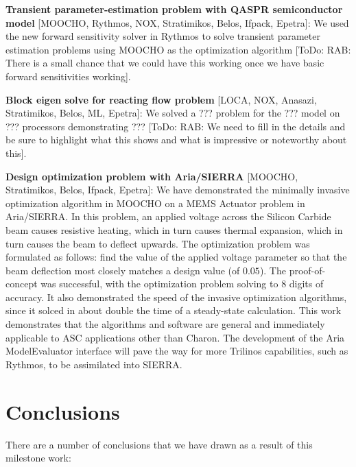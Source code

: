 \documentclass[pdf,ps2pdf,11pt]{SANDreport}
\begin{document}
{}\noindent\textbf{Transient parameter-estimation problem with QASPR
semiconductor model} [MOOCHO, Rythmos, NOX, Stratimikos, Belos, Ifpack,
Epetra]: We used the new forward sensitivity solver in Rythmos to solve
transient parameter estimation problems using MOOCHO as the optimization
algorithm [ToDo: RAB: There is a small chance that we could have this working
once we have basic forward sensitivities working].

{}\noindent\textbf{Block eigen solve for reacting flow problem} [LOCA, NOX,
Anasazi, Stratimikos, Belos, ML, Epetra]: We solved a ??? problem for the ??? 
model on ??? processors demonstrating ??? [ToDo: RAB: We need to fill in the
details and be sure to highlight what this shows and what is impressive or
noteworthy about this].

{}\noindent\textbf{Design optimization problem with Aria/SIERRA} [MOOCHO,
Stratimikos, Belos, Ifpack, Epetra]: We have demonstrated the minimally
invasive optimization algorithm in MOOCHO on a MEMS Actuator problem in Aria/SIERRA.
In this problem, an applied voltage across the Silicon Carbide beam causes
resistive heating, which in turn causes thermal expansion, which in turn
causes the beam to deflect upwards. The optimization problem was formulated 
as follows: find the value of the applied voltage parameter so that the beam 
deflection most closely matches a design value (of $0.05$). The proof-of-concept
was successful, with the optimization problem 
solving to $8$ digits of accuracy. It also demonstrated the speed of the invasive
optimization algorithms, since it solced in about double the time of a steady-state calculation.
This work demonstrates that the algorithms and software are general and immediately 
applicable to ASC applications other than Charon. The development of the Aria ModelEvaluator
interface will pave the way for more Trilinos capabilities, such as Rythmos, to
be assimilated into SIERRA. 

%
\section{Conclusions}
%

There are a number of conclusions that we have drawn as a result of this
milestone work:
\end{document}
